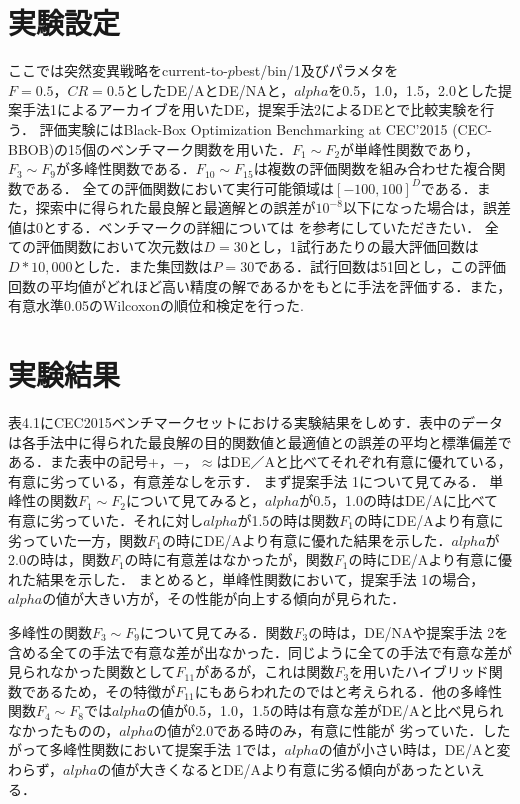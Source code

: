 \documentclass[a4paper,11pt,oneside,openany]{jsbook}
\begin{document}
\section{実験設定}
ここでは突然変異戦略をcurrent-to-$p$best/bin/1及びパラメタを$F=0.5，CR=0.5$としたDE/AとDE/NAと，$alpha$を0.5，1.0，1.5，2.0とした提案手法1によるアーカイブを用いたDE，提案手法2によるDEとで比較実験を行う．
評価実験にはBlack-Box Optimization Benchmarking at CEC'2015 (CEC-BBOB)の15個のベンチマーク関数を用いた．$F_{1}{\sim}F_{2}$が単峰性関数であり，$F_3{\sim}F_9$が多峰性関数である．$F_{10}{\sim}F_{15}$は複数の評価関数を組み合わせた複合関数である．
全ての評価関数において実行可能領域は$[-100,100]^D$である．また，探索中に得られた最良解と最適解との誤差が$10^{-8}$以下になった場合は，誤差値は0とする．ベンチマークの詳細については \cite{CEC2015} を参考にしていただきたい．
全ての評価関数において次元数は$D=30$とし，1試行あたりの最大評価回数は$D*10,000$とした．また集団数は$P=30$である．試行回数は51回とし，この評価回数の平均値がどれほど高い精度の解であるかをもとに手法を評価する．また，有意水準0.05のWilcoxonの順位和検定を行った.


\section{実験結果}
表4.1にCEC2015ベンチマークセットにおける実験結果をしめす．表中のデータは各手法中に得られた最良解の目的関数値と最適値との誤差の平均と標準偏差である．また表中の記号+，−，$\approx$はDE／Aと比べてそれぞれ有意に優れている，有意に劣っている，有意差なしを示す．
まず提案手法 1について見てみる．
単峰性の関数$F_{1}{\sim}F_{2}$について見てみると，$alpha$が0.5，1.0の時はDE/Aに比べて有意に劣っていた．それに対し$alpha$が1.5の時は関数$F_{1}$の時にDE/Aより有意に劣っていた一方，関数$F_{1}$の時にDE/Aより有意に優れた結果を示した．$alpha$が2.0の時は，関数$F_{1}$の時に有意差はなかったが，関数$F_{1}$の時にDE/Aより有意に優れた結果を示した．
まとめると，単峰性関数において，提案手法 1の場合，$alpha$の値が大きい方が，その性能が向上する傾向が見られた．

多峰性の関数$F_{3}{\sim}F_{9}$について見てみる．関数$F_{3}$の時は，DE/NAや提案手法 2を含める全ての手法で有意な差が出なかった．同じように全ての手法で有意な差が見られなかった関数として$F_{11}$があるが，これは関数$F_{3}$を用いたハイブリッド関数であるため，その特徴が$F_{11}$にもあらわれたのではと考えられる．他の多峰性関数$F_{4}{\sim}F_{8}$では$alpha$の値が0.5，1.0，1.5の時は有意な差がDE/Aと比べ見られなかったものの，$alpha$の値が2.0である時のみ，有意に性能が
劣っていた．したがって多峰性関数において提案手法 1では，$alpha$の値が小さい時は，DE/Aと変わらず，$alpha$の値が大きくなるとDE/Aより有意に劣る傾向があったといえる．
\end{document}
